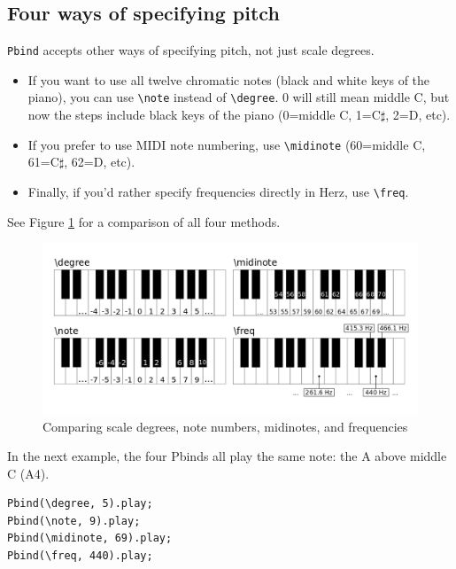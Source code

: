\subsection{Four ways of specifying pitch}

\texttt{Pbind} accepts other ways of specifying pitch, not just scale degrees.
\begin{itemize}
\item If you want to use all twelve chromatic notes (black and white keys of the piano), you can use \texttt{\textbackslash note} instead of \texttt{\textbackslash degree}. 0 will still mean middle C, but now the steps include black keys of the piano (0=middle C, 1=C$\sharp$, 2=D, etc).
\item  If you prefer to use MIDI note numbering, use \texttt{\textbackslash midinote} (60=middle C, 61=C$\sharp$, 62=D, etc).
\item Finally, if you'd rather specify frequencies directly in Herz, use \texttt{\textbackslash freq}.
\end{itemize}

See Figure \ref{fig:scale-degrees} for a comparison of all four methods.

\begin{figure}[h]
\centering
\includegraphics[scale=0.4]{fig-piano-keyboard-degree-note-midinote-freq.png}
\caption{Comparing scale degrees, note numbers, midinotes, and frequencies}
\label{fig:scale-degrees}
\end{figure}

In the next example, the four Pbinds all play the same note: the A above middle C (A4).

\begin{lstlisting}[style=SuperCollider-IDE, basicstyle=\scttfamily\footnotesize]
Pbind(\degree, 5).play;
Pbind(\note, 9).play;
Pbind(\midinote, 69).play;
Pbind(\freq, 440).play;
\end{lstlisting}


